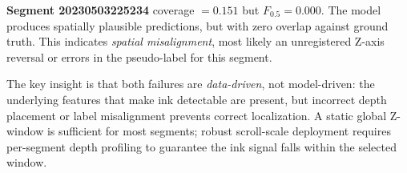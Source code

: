 \textbf{Segment 20230503225234} coverage $= 0.151$ but $F_{0.5} = 0.000$. The model produces spatially plausible predictions, but with zero overlap against ground truth. This indicates \emph{spatial misalignment}, most likely an unregistered Z-axis reversal or errors in the pseudo-label for this segment.

The key insight is that both failures are \emph{data-driven}, not model-driven: the underlying features that make ink detectable are present, but incorrect depth placement or label misalignment prevents correct localization. A static global Z-window is sufficient for most segments; robust scroll-scale deployment requires per-segment depth profiling to guarantee the ink signal falls within the selected window.

\vspace{2\baselineskip}

\newpage